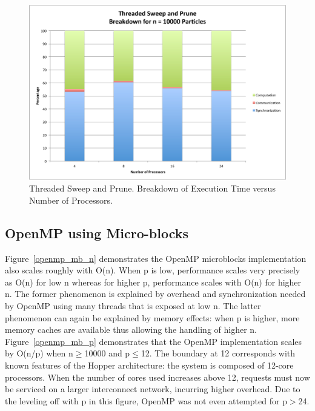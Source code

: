 \documentclass[11pt]{article} %
\begin{document}
\begin{figure}
\begin{centering}
\includegraphics[width=0.5\paperwidth]{figures/thread_breakdown_10000}
\par\end{centering}

\caption{Threaded Sweep and Prune. Breakdown of Execution Time versus Number
of Processors.}
\label{plot:thread_breakdown_10000}
\end{figure}

\subsection{OpenMP using Micro-blocks}

Figure~\ref{openmp_mb_n}  demonstrates the OpenMP microblocks implementation also scales roughly with O(n). When p is low, performance scales very precisely as O(n) for low n whereas for higher p, performance scales with O(n) for higher n. The former phenomenon is explained by overhead and synchronization needed by OpenMP using many threads that is exposed at low n. The latter phenomenon can again be explained by memory effects: when p is higher, more memory caches are available thus allowing the handling of higher n. Figure~\ref{openmp_mb_p} demonstrates that the OpenMP implementation scales by O(n/p) when n$\geq$10000 and p$\leq$12. The boundary at 12 corresponds with known features of the Hopper architecture: the system is composed of 12-core processors. When the number of cores used increases above 12, requests must now be serviced on a larger interconnect network, incurring higher overhead. Due to the leveling off with p in this figure, OpenMP was not even attempted for p$>$24.
\end{document}
